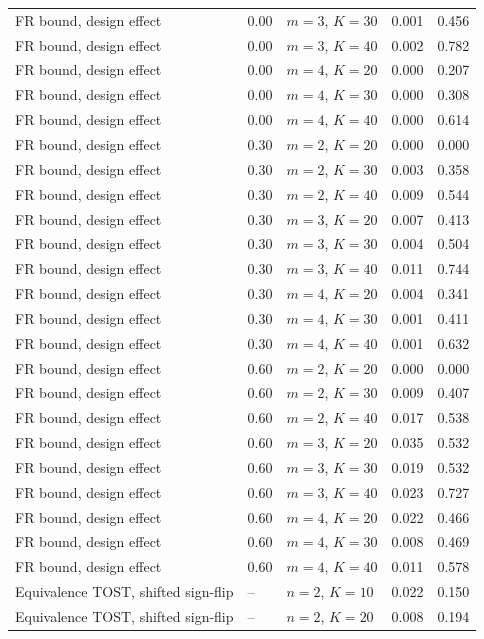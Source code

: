 \begin{table}[t]
\begin{tabular}{lllcc}
FR bound, design effect & 0.00 & $m=3$, $K=30$ & 0.001 & 0.456 \\
FR bound, design effect & 0.00 & $m=3$, $K=40$ & 0.002 & 0.782 \\
FR bound, design effect & 0.00 & $m=4$, $K=20$ & 0.000 & 0.207 \\
FR bound, design effect & 0.00 & $m=4$, $K=30$ & 0.000 & 0.308 \\
FR bound, design effect & 0.00 & $m=4$, $K=40$ & 0.000 & 0.614 \\
FR bound, design effect & 0.30 & $m=2$, $K=20$ & 0.000 & 0.000 \\
FR bound, design effect & 0.30 & $m=2$, $K=30$ & 0.003 & 0.358 \\
FR bound, design effect & 0.30 & $m=2$, $K=40$ & 0.009 & 0.544 \\
FR bound, design effect & 0.30 & $m=3$, $K=20$ & 0.007 & 0.413 \\
FR bound, design effect & 0.30 & $m=3$, $K=30$ & 0.004 & 0.504 \\
FR bound, design effect & 0.30 & $m=3$, $K=40$ & 0.011 & 0.744 \\
FR bound, design effect & 0.30 & $m=4$, $K=20$ & 0.004 & 0.341 \\
FR bound, design effect & 0.30 & $m=4$, $K=30$ & 0.001 & 0.411 \\
FR bound, design effect & 0.30 & $m=4$, $K=40$ & 0.001 & 0.632 \\
FR bound, design effect & 0.60 & $m=2$, $K=20$ & 0.000 & 0.000 \\
FR bound, design effect & 0.60 & $m=2$, $K=30$ & 0.009 & 0.407 \\
FR bound, design effect & 0.60 & $m=2$, $K=40$ & 0.017 & 0.538 \\
FR bound, design effect & 0.60 & $m=3$, $K=20$ & 0.035 & 0.532 \\
FR bound, design effect & 0.60 & $m=3$, $K=30$ & 0.019 & 0.532 \\
FR bound, design effect & 0.60 & $m=3$, $K=40$ & 0.023 & 0.727 \\
FR bound, design effect & 0.60 & $m=4$, $K=20$ & 0.022 & 0.466 \\
FR bound, design effect & 0.60 & $m=4$, $K=30$ & 0.008 & 0.469 \\
FR bound, design effect & 0.60 & $m=4$, $K=40$ & 0.011 & 0.578 \\
Equivalence TOST, shifted sign-flip & -- & $n=2$, $K=10$ & 0.022 & 0.150 \\
Equivalence TOST, shifted sign-flip & -- & $n=2$, $K=20$ & 0.008 & 0.194 \\

\end{tabular}
\end{table}
